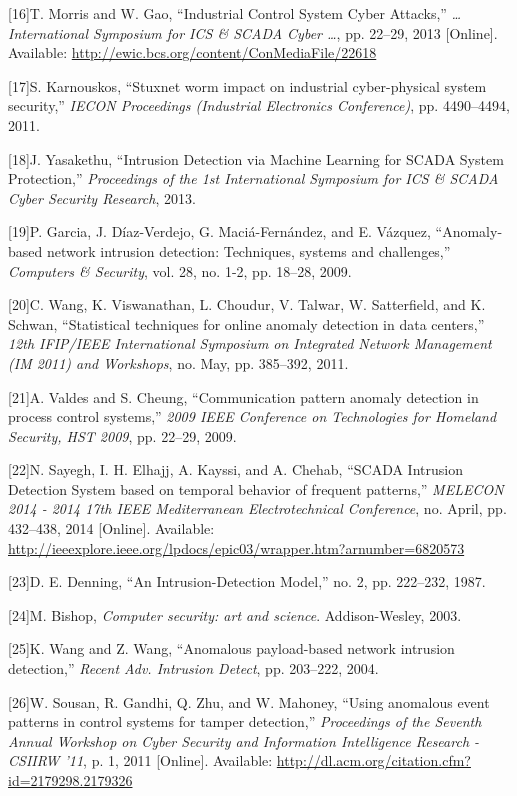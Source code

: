 \documentclass[12pt,]{article}
\begin{document}
{[}16{]}T. Morris and W. Gao, ``Industrial Control System Cyber
Attacks,'' \emph{\ldots{}International Symposium for ICS \& SCADA Cyber
\ldots{}}, pp. 22--29, 2013 {[}Online{]}. Available:
\url{http://ewic.bcs.org/content/ConMediaFile/22618}

{[}17{]}S. Karnouskos, ``Stuxnet worm impact on industrial
cyber-physical system security,'' \emph{IECON Proceedings (Industrial
Electronics Conference)}, pp. 4490--4494, 2011.

{[}18{]}J. Yasakethu, ``Intrusion Detection via Machine Learning for
SCADA System Protection,'' \emph{Proceedings of the 1st International
Symposium for ICS \& SCADA Cyber Security Research}, 2013.

{[}19{]}P. Garcia, J. Díaz-Verdejo, G. Maciá-Fernández, and E. Vázquez,
``Anomaly-based network intrusion detection: Techniques, systems and
challenges,'' \emph{Computers \& Security}, vol. 28, no. 1-2, pp.
18--28, 2009.

{[}20{]}C. Wang, K. Viswanathan, L. Choudur, V. Talwar, W. Satterfield,
and K. Schwan, ``Statistical techniques for online anomaly detection in
data centers,'' \emph{12th IFIP/IEEE International Symposium on
Integrated Network Management (IM 2011) and Workshops}, no. May, pp.
385--392, 2011.

{[}21{]}A. Valdes and S. Cheung, ``Communication pattern anomaly
detection in process control systems,'' \emph{2009 IEEE Conference on
Technologies for Homeland Security, HST 2009}, pp. 22--29, 2009.

{[}22{]}N. Sayegh, I. H. Elhajj, A. Kayssi, and A. Chehab, ``SCADA
Intrusion Detection System based on temporal behavior of frequent
patterns,'' \emph{MELECON 2014 - 2014 17th IEEE Mediterranean
Electrotechnical Conference}, no. April, pp. 432--438, 2014
{[}Online{]}. Available:
\url{http://ieeexplore.ieee.org/lpdocs/epic03/wrapper.htm?arnumber=6820573}

{[}23{]}D. E. Denning, ``An Intrusion-Detection Model,'' no. 2, pp.
222--232, 1987.

{[}24{]}M. Bishop, \emph{Computer security: art and science}.
Addison-Wesley, 2003.

{[}25{]}K. Wang and Z. Wang, ``Anomalous payload-based network intrusion
detection,'' \emph{Recent Adv. Intrusion Detect}, pp. 203--222, 2004.

{[}26{]}W. Sousan, R. Gandhi, Q. Zhu, and W. Mahoney, ``Using anomalous
event patterns in control systems for tamper detection,''
\emph{Proceedings of the Seventh Annual Workshop on Cyber Security and
Information Intelligence Research - CSIIRW '11}, p. 1, 2011
{[}Online{]}. Available:
\url{http://dl.acm.org/citation.cfm?id=2179298.2179326}
\end{document}
